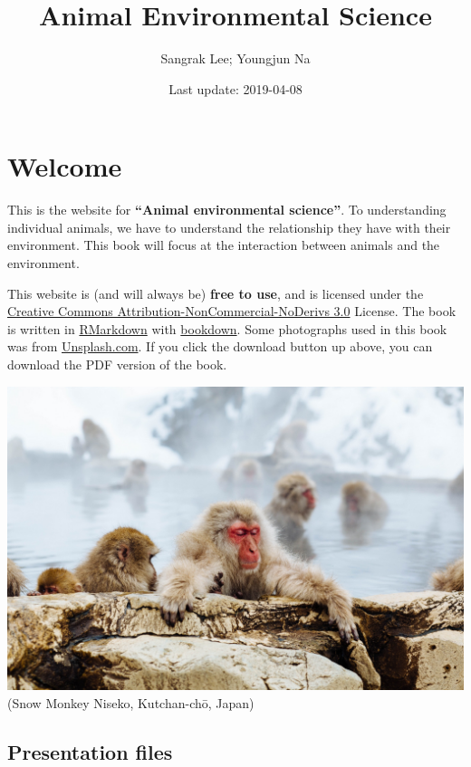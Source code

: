\documentclass[]{book}
\title{Animal Environmental Science}
\author{Sangrak Lee; Youngjun Na}
\date{Last update: 2019-04-08}
\begin{document}
\maketitle

{
\setcounter{tocdepth}{1}
\tableofcontents
}
\chapter*{Welcome}\label{welcome}

This is the website for \textbf{``Animal environmental science''}. To
understanding individual animals, we have to understand the relationship
they have with their environment. This book will focus at the
interaction between animals and the environment.

This website is (and will always be) \textbf{free to use}, and is
licensed under the
\href{http://creativecommons.org/licenses/by-nc-nd/3.0/us/}{Creative
Commons Attribution-NonCommercial-NoDerivs 3.0} License. The book is
written in \href{https://rmarkdown.rstudio.com}{RMarkdown} with
\href{https://bookdown.org}{bookdown}. Some photographs used in this
book was from \href{https://unsplash.com/}{Unsplash.com}. If you click
the download button up above, you can download the PDF version of the
book.

\includegraphics{figures/monkey.jpeg}\\
(Snow Monkey Niseko, Kutchan-chō, Japan)

\section{Presentation files}\label{presentation-files}
\end{document}
